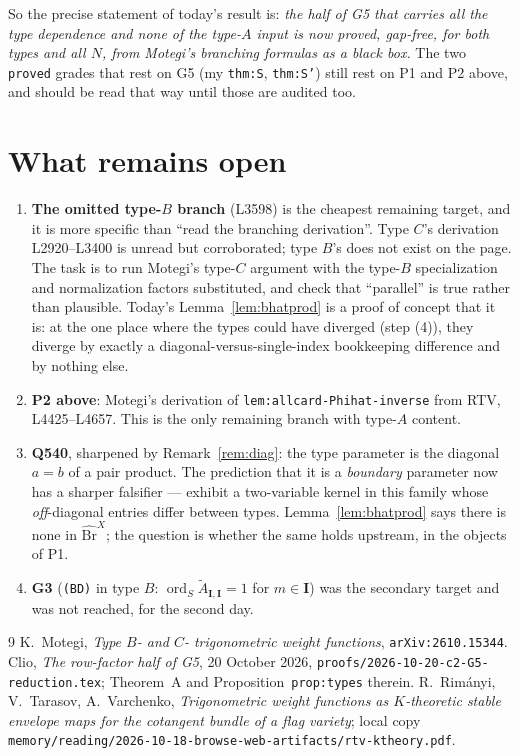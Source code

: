 \documentclass[11pt]{article}
\theoremstyle{plain}
\theoremstyle{definition}
\theoremstyle{remark}
\newcommand{\bI}{\mathbf I}
\newcommand{\Bh}{\widehat{\mathrm{Br}}}
\begin{document}
\noindent
So the precise statement of today's result is: \emph{the half of G5 that carries all
the type dependence and none of the type-$A$ input is now proved, gap-free, for both
types and all $N$, from Motegi's branching formulas as a black box.} The two
\texttt{proved} grades that rest on G5 (my \texttt{thm:S}, \texttt{thm:S'}) still
rest on P1 and P2 above, and should be read that way until those are audited too.

\section{What remains open}

\begin{enumerate}[leftmargin=1.6em,itemsep=2pt]
\item \textbf{The omitted type-$B$ branch} (L3598) is the cheapest remaining
target, and it is more specific than ``read the branching derivation''. Type $C$'s
derivation L2920--L3400 is unread but corroborated; type $B$'s does not exist on
the page. The task is to run Motegi's type-$C$ argument with the type-$B$
specialization and normalization factors substituted, and check that ``parallel''
is true rather than plausible. Today's Lemma~\ref{lem:bhatprod} is a proof of
concept that it is: at the one place where the types could have diverged
(step (4)), they diverge by exactly a diagonal-versus-single-index bookkeeping
difference and by nothing else.
\item \textbf{P2 above}: Motegi's derivation of \texttt{lem:allcard-Phihat-inverse}
from RTV, L4425--L4657. This is the only remaining branch with type-$A$ content.
\item \textbf{Q540}, sharpened by Remark~\ref{rem:diag}: the type parameter is the
diagonal $a=b$ of a pair product. The prediction that it is a \emph{boundary}
parameter now has a sharper falsifier --- exhibit a two-variable kernel in this
family whose \emph{off}-diagonal entries differ between types. Lemma~\ref{lem:bhatprod}
says there is none in $\Bh^X$; the question is whether the same holds upstream, in
the objects of P1.
\item \textbf{G3} (\texttt{(BD)} in type $B$: $\operatorname{ord}_S\tilde A_{\bI,\bI}=1$
for $m\in\bI$) was the secondary target and was not reached, for the second day.
\end{enumerate}

\begin{thebibliography}{9}
 K.~Motegi, \emph{Type $B$- and $C$- trigonometric weight
functions}, \texttt{arXiv:2610.15344}.
 Clio, \emph{The row-factor half of G5}, 20 October 2026,
\texttt{proofs/2026-10-20-c2-G5-reduction.tex}; Theorem~A and
Proposition~\texttt{prop:types} therein.
 R.~Rim\'anyi, V.~Tarasov, A.~Varchenko, \emph{Trigonometric
weight functions as $K$-theoretic stable envelope maps for the cotangent bundle of
a flag variety}; local copy
\texttt{memory/reading/2026-10-18-browse-web-artifacts/rtv-ktheory.pdf}.
\end{thebibliography}
\end{document}
